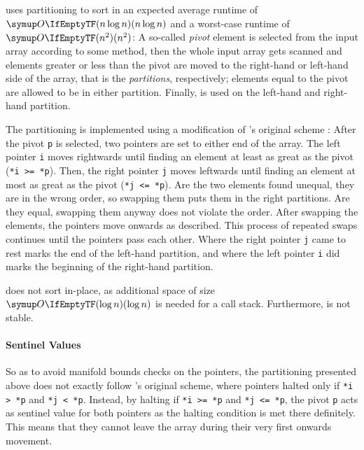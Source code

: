 \section{\texorpdfstring{\QS{}}{QuickSort}}
\label{sec:tasklet:quick}

\QS{} \cites{hoare1962quicksort}[88-91]{maurer1974datenstrukturen}[Chapter~2.2.6]{wirth1975algorithmen} uses partitioning to sort in an expected average runtime of \(\bigoh{n \log n}\) and a worst-case runtime of \(\bigoh{n^2}\):
A so-called \emph{pivot} element is selected from the input array according to some method, then the whole input array gets scanned and elements greater or less than the pivot are moved to the right-hand or left-hand side of the array, that is the \emph{partitions}, respectively;
elements equal to the pivot are allowed to be in either partition.
Finally, \QS{} is used on the left-hand and right-hand partition.

The partitioning is implemented using a modification of \citeauthor{hoare1962quicksort}'s original scheme \cite{hoare1962quicksort}:
After the pivot \lstinline|p| is selected, two pointers are set to either end of the array.
The left pointer \lstinline|i| moves rightwards until finding an element at least as great as the pivot (\lstinline|*i >= *p|).
Then, the right pointer \lstinline|j| moves leftwards until finding an element at most as great as the pivot (\lstinline|*j <= *p|).
Are the two elements found unequal, they are in the wrong order, so swapping them puts them in the right partitions.
Are they equal, swapping them anyway does not violate the order.
After swapping the elements, the pointers move onwards as described.
This process of repeated swaps continues until the pointers pass each other.
Where the right pointer \lstinline|j| came to rest marks the end of the left-hand partition, and where the left pointer \lstinline|i| did marks the beginning of the right-hand partition.

\QS{} does not sort in-place, as additional space of size \(\bigoh{\log n}\) is needed for a call stack.
Furthermore, \QS{} is not stable.


\paragraph{Sentinel Values}
\label{sec:tasklet:quick:imp:sentinels}
So as to avoid manifold bounds checks on the pointers, the partitioning presented above does not exactly follow \citeauthor{hoare1962quicksort}'s original scheme, where pointers halted only if \lstinline|*i > *p| and \lstinline|*j < *p|.
Instead, by halting if \lstinline|*i >= *p| and \lstinline|*j <= *p|, the pivot \lstinline|p| acts as sentinel value for both pointers as the halting condition is met there definitely.
This means that they cannot leave the array during their very first onwards movement.

